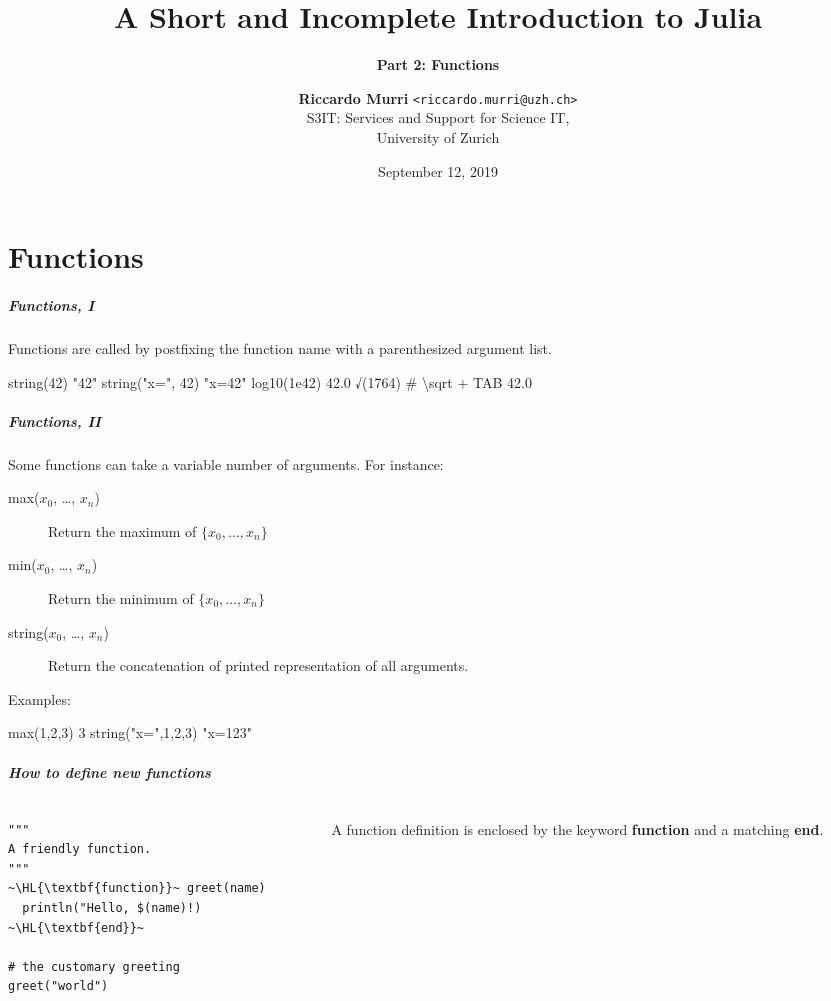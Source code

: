\documentclass[english,serif,mathserif,xcolor=pdftex,dvipsnames,table]{beamer}
\title[2. Functions]{%
  A Short and Incomplete Introduction to Julia
}
\subtitle{\bfseries Part 2: Functions}
\author[R.~Murri]{%
  \textbf{Riccardo Murri} \texttt{<riccardo.murri@uzh.ch>}
  \\
  S3IT: Services and Support for Science IT,
  \\
  University of Zurich
}
\date{September 12, 2019}
\begin{document}
\maketitle


\part{Functions}

\begin{frame}[fragile,label=func1]
  \frametitle{Functions, I}
  Functions are called by postfixing the function name with a
  parenthesized argument list.

  \+
\begin{semiverbatim}
\julia string(42)
"42"
\julia string("x=", 42)
"x=42"
\julia log10(1e42)
42.0
\julia √(1764)  # {\textbackslash}sqrt + TAB
42.0
\end{semiverbatim}
\end{frame}


\begin{frame}
  \frametitle{Functions, II}
  Some functions can take a variable number of arguments. For instance:

  \+
  \begin{description}
    \item[max($x_0$, \ldots, $x_n$)] Return the maximum of $\{ x_0, \ldots, x_n \}$
    \item[min($x_0$, \ldots, $x_n$)] Return the minimum of $\{ x_0, \ldots, x_n \}$
    \item[string($x_0$, \ldots, $x_n$)] Return the concatenation of printed representation of all arguments.
  \end{description}

  \+
  Examples:
\begin{semiverbatim}
\julia max(1,2,3)
3
\julia string("x=",1,2,3)
"x=123"
\end{semiverbatim}
\end{frame}


\begin{frame}[fragile]
  \frametitle{How to define new functions}
  \begin{columns}[t]
    \begin{column}{0.5\textwidth}
\begin{lstlisting}
"""
A friendly function.
"""
~\HL{\textbf{function}}~ greet(name)
  println("Hello, $(name)!)
~\HL{\textbf{end}}~

# the customary greeting
greet("world")
\end{lstlisting}
    \end{column}
    \begin{column}{0.5\textwidth}
      \raggedleft
      A function definition is enclosed by the keyword \textbf{function} and a matching \textbf{end}.
    \end{column}
  \end{columns}
\end{frame}
\end{document}
